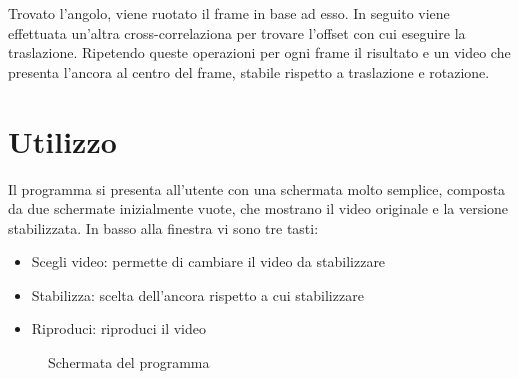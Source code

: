 \documentclass[12pt]{article}
\begin{document}
Trovato l'angolo, viene ruotato il frame in base ad esso. In seguito viene effettuata un'altra cross-correlaziona per trovare l'offset con cui eseguire la traslazione. Ripetendo queste operazioni per ogni frame il risultato e un video che presenta l'ancora al centro del frame, stabile rispetto a traslazione e rotazione.

\clearpage
\section{Utilizzo}
Il programma si presenta all'utente con una schermata molto semplice, composta da due
schermate inizialmente vuote, che mostrano il video originale e la versione stabilizzata.
In basso alla finestra vi sono tre tasti:
\begin{itemize}
	\item Scegli video: permette di cambiare il video da stabilizzare
	\item Stabilizza: scelta dell'ancora rispetto a cui stabilizzare
	\item Riproduci: riproduci il video
\end{itemize}

\begin{figure}[h!]
	\begin{center}
	  \caption{Schermata del programma}
	\end{center}
\end{figure}
\end{document}
